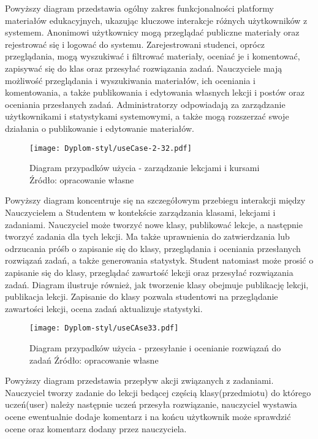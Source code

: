 Powyższy diagram przedstawia ogólny zakres funkcjonalności platformy materiałów edukacyjnych, ukazując kluczowe interakcje różnych użytkowników z systemem. Anonimowi użytkownicy mogą przeglądać publiczne materiały oraz rejestrować się i logować do systemu. Zarejestrowani studenci, oprócz przeglądania, mogą wyszukiwać i filtrować materiały, oceniać je i komentować, zapisywać się do klas oraz przesyłać rozwiązania zadań. Nauczyciele mają możliwość przeglądania i wyszukiwania materiałów, ich oceniania i komentowania, a także publikowania i edytowania własnych lekcji i postów oraz oceniania przesłanych zadań. Administratorzy odpowiadają za zarządzanie użytkownikami i statystykami systemowymi, a także mogą rozszerzać swoje działania o publikowanie i edytowanie materiałów.
\begin{figure}[H]
  \centering
  \texttt{[image: Dyplom-styl/useCase-2-32.pdf]}
  \caption{Diagram przypadków użycia - zarządzanie lekcjami i kursami Źródło: opracowanie własne}
  \label{fig:system_klas_zadan}
\end{figure}
Powyższy diagram koncentruje się na szczegółowym przebiegu interakcji między Nauczycielem a Studentem w kontekście zarządzania klasami, lekcjami i zadaniami. Nauczyciel może tworzyć nowe klasy, publikować lekcje, a następnie tworzyć zadania dla tych lekcji. Ma także uprawnienia do zatwierdzania lub odrzucania próśb o zapisanie się do klasy, przeglądania i oceniania przesłanych rozwiązań zadań, a także generowania statystyk. Student natomiast może prosić o zapisanie się do klasy, przeglądać zawartość lekcji oraz przesyłać rozwiązania zadań. Diagram ilustruje również, jak tworzenie klasy obejmuje publikację lekcji, publikacja lekcji. Zapisanie do klasy pozwala studentowi na przeglądanie zawartości lekcji, ocena zadań aktualizuje statystyki.

\begin{figure}[H]
  \centering
  \texttt{[image: Dyplom-styl/useCAse33.pdf]}
  \caption{Diagram przypadków użycia -  przesyłanie i ocenianie rozwiązań do zadań  Źródło: opracowanie własne}
  \label{fig:system_klas_zadan}
\end{figure}
Powyższy diagram przedstawia przepływ akcji związanych z zadaniami. Nauczyciel tworzy zadanie do lekcji bedącej częścią klasy(przedmiotu) do którego uczeń(user) należy następnie uczeń przesyła rozwiązanie, nauczyciel wystawia ocene ewentualnie dodaje komentarz i na końcu użytkownik może sprawdzić ocene oraz komentarz dodany przez nauczyciela.
